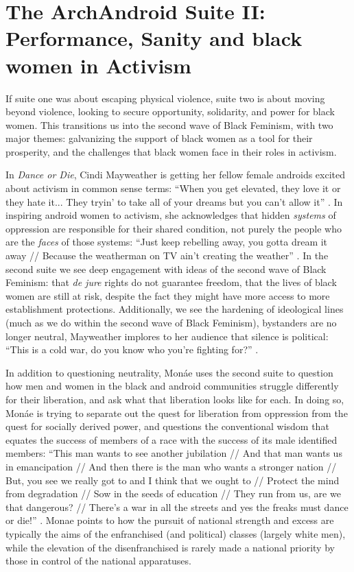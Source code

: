 \documentclass[a4paper, 11pt]{article} %
\begin{document}

\section*{The ArchAndroid Suite II: Performance, Sanity and black women in Activism}

If suite one was about escaping physical violence, suite two is about moving beyond violence, looking to secure opportunity, solidarity, and power for black women.
This transitions us into the second wave of Black Feminism, with two major themes: galvanizing the support of black women as a tool for their prosperity, and the challenges that black women face in their roles in activism.

In \emph{Dance or Die}, Cindi Mayweather is getting her fellow female androids excited about activism in common sense terms:
``When you get elevated, they love it or they hate it... They tryin' to take all of your dreams but you can't allow it'' \cite{tightrope}.
In inspiring android women to activism, she acknowledges that hidden \emph{systems} of oppression are responsible for their shared condition, not purely the people who are the \emph{faces} of those systems:
``Just keep rebelling away, you gotta dream it away // Because the weatherman on TV ain't creating the weather'' \cite{danceordie}. 
In the second suite we see deep engagement with ideas of the second wave of Black Feminism: that \emph{de jure} rights do not guarantee freedom, that the lives of black women are still at risk, despite the fact they might have more access to more establishment protections.
Additionally, we see the hardening of ideological lines (much as we do within the second wave of Black Feminism), bystanders are no longer neutral, Mayweather implores to her audience that silence is political:
``This is a cold war, do you know who you're fighting for?'' \cite{coldwar}.

In addition to questioning neutrality, Mon\'ae uses the second suite to question how men and women in the black and android communities struggle differently for their liberation, and ask what that liberation looks like for each.
In doing so, Mon\'ae is trying to separate out the quest for liberation from oppression from the quest for socially derived power, and questions the conventional wisdom that equates the success of members of a race with the success of its male identified members:
``This man wants to see another jubilation //
And that man wants us in emancipation //
And then there is the man who wants a stronger nation //
But, you see we really got to and I think that we ought to //
Protect the mind from degradation //
Sow in the seeds of education //
They run from us, are we that dangerous? //
There's a war in all the streets and yes the freaks must dance or die!'' \cite{danceordie}.
Monae points to how the pursuit of national strength and excess are typically the aims of the enfranchised (and political) classes (largely white men), while the elevation of the disenfranchised is rarely made a national priority by those in control of the national apparatuses.
\end{document}
